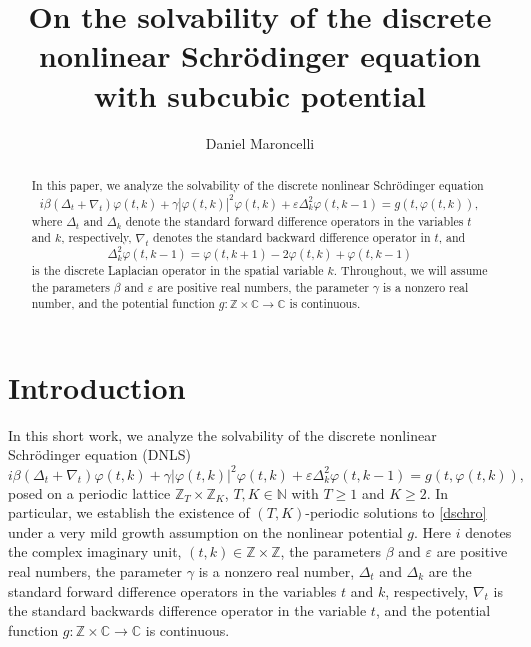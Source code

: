 \documentclass[12 pt,twoside]{amsart}
\newcommand{\N}{\mathbb{N}}
\newcommand{\C}{\mathbb{C}}
\newcommand{\Z}{\mathbb{Z}}
\newcommand{\be}{\begin{equation}}
\newcommand{\ee}{\end{equation}}
\newcommand{\bes}{\begin{equation*}}
\newcommand{\ees}{\end{equation*}}
\newcommand{\ve}{\varepsilon}
\renewcommand{\phi}{\varphi}
\numberwithin{equation}{section}
\theoremstyle{definition}
\theoremstyle{remark}
\begin{document}
\setlength{\parskip}{.15cm}
\title[On the solvability of DNLS]{On the solvability of the discrete nonlinear Schr\"{o}dinger equation with subcubic potential}

\address{Daniel Maroncelli \newline
Department of Mathematics, College of Charleston  George Street, Charleston, SC 29424 USA}

\author{Daniel Maroncelli}

\begin{abstract}
In this paper, we analyze the solvability of the discrete nonlinear Schr\"odinger equation
\bes
i\beta(\Delta_t+\nabla_t)\phi(t,k)
+\gamma |\phi(t,k)|^2\phi(t,k)
+\ve \Delta_k^2\phi(t,k-1)
=
g(t,\phi(t,k)),
\ees
where $\Delta_t$ and $\Delta_k$ denote the standard forward difference operators in the variables $t$ and $k$, respectively, $\nabla_t$ denotes the standard backward difference operator in $t$, {and}
\bes
\Delta_k^2\phi(t,k-1)
=
\phi(t,k+1)-2\phi(t,k)+\phi(t,k-1)
\ees
is the discrete Laplacian operator in the spatial variable $k$. Throughout, we will assume the parameters $\beta$ and $\ve$ are positive real numbers, the parameter $\gamma$ is a nonzero real number, and the potential function $g:\Z\times\C\to \C$ is continuous.
\end{abstract}


\maketitle

\section{Introduction}

In this short work, we analyze the solvability of the discrete nonlinear  Schr\"{o}dinger equation (DNLS)
\be\label{dschro}
i\beta(\Delta_t+\nabla_t)\phi(t,k) +\gamma|\phi(t,k)|^2\phi(t,k)+\ve\Delta^2_k\phi(t,k-1)=g(t,\phi(t,k)),
\ee
posed on a periodic lattice $\Z_T\times \Z_K$, $T,K\in \N$ with $T\geq 1$ and $K\geq 2$. In particular, we establish the existence of $(T,K)$-periodic solutions to \eqref{dschro} under a very mild growth assumption on the nonlinear potential $g$.  Here $i$ denotes the complex imaginary unit, $(t,k)\in \Z\times \Z$, the parameters $\beta$ and $\ve$ are positive real numbers, the parameter $\gamma$ is a nonzero real number, $\Delta_t$ and $\Delta_k$ are the standard forward difference operators in the variables $t$ and $k$,  respectively, $\nabla_t$ is the standard backwards difference operator in the variable $t$, and the potential function $g:\Z\times \C\to \C$ is continuous.
\end{document}
